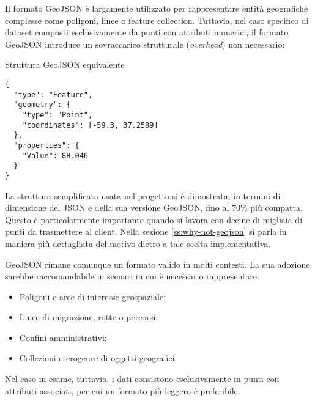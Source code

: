 Il formato GeoJSON è largamente utilizzato per rappresentare entità geografiche complesse come poligoni, linee o feature collection. 
Tuttavia, nel caso specifico di dataset composti esclusivamente da punti con attributi numerici, il formato GeoJSON introduce un sovraccarico strutturale (\textit{overhead}) non necessario:

\begin{listing}[H]
\caption{Struttura GeoJSON equivalente}
\label{lst:geojson_equivalent_structure} %
\begin{verbatim}
{
  "type": "Feature",
  "geometry": {
    "type": "Point",
    "coordinates": [-59.3, 37.2589]
  },
  "properties": {
    "Value": 88.046
  }
}
\end{verbatim}
\end{listing}

La struttura semplificata usata nel progetto si è dimostrata, in termini di dimensione del JSON e della sua versione GeoJSON, fino al 70\% più compatta. Questo è particolarmente importante quando si lavora con decine di migliaia di punti da trasmettere al client. Nella sezione \ref{ss:why-not-geojson} si parla in maniera più dettagliata del motivo dietro a tale scelta implementativa.

GeoJSON rimane comunque un formato valido in molti contesti. La sua adozione sarebbe raccomandabile in scenari in cui è necessario rappresentare:

\begin{itemize}
  \item Poligoni e aree di interesse geospaziale;
  \item Linee di migrazione, rotte o percorsi;
  \item Confini amministrativi;
  \item Collezioni eterogenee di oggetti geografici.
\end{itemize}

Nel caso in esame, tuttavia, i dati consistono esclusivamente in punti con attributi associati, per cui un formato più leggero è preferibile.